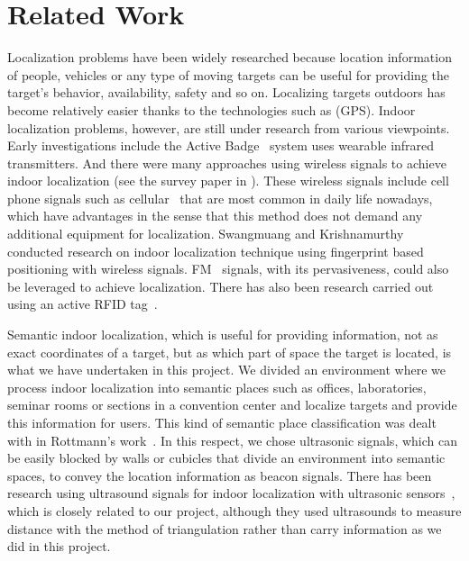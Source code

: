 \section{Related Work}
\label{sec:related-works}

Localization problems have been widely researched because location information of people, vehicles or any type of moving targets can be useful for providing the target's behavior, availability, safety and so on. Localizing targets outdoors has become relatively easier thanks to the technologies such as (GPS). Indoor localization problems, however, are still under research from various viewpoints. Early investigations include the Active Badge~\cite{want1992active} system uses wearable infrared transmitters. And there were many approaches using wireless signals to achieve indoor localization (see the survey paper in \cite{liu2007}). These wireless signals include cell phone signals such as cellular~\cite{otsason2005accurate} that are most common in daily life nowadays, which have advantages in the sense that this method does not demand any additional equipment for localization. Swangmuang and Krishnamurthy~\cite{Swangmuang2008} conducted research on indoor localization technique using fingerprint based positioning with wireless signals. FM~\cite{chen2012fm} signals, with its pervasiveness, could also be leveraged to achieve localization. There has also been research carried out using an active RFID tag~\cite{Jin2006, buettner2009recognizing}.

Semantic indoor localization, which is useful for providing information, not as exact coordinates of a target, but as which part of space the target is located, is what we have undertaken in this project. We divided an environment where we process indoor localization into semantic places such as offices, laboratories, seminar rooms or sections in a convention center and localize targets and provide this information for users. This kind of semantic place classification was dealt with in Rottmann's work~\cite{rottmann2005semantic}. In this respect, we chose ultrasonic signals, which can be easily blocked by walls or cubicles that divide an environment into semantic spaces, to convey the location information as beacon signals. There has been research using ultrasound signals for indoor localization with ultrasonic sensors~\cite{feng1997mobile, priyantha2005cricket}, which is closely related to our project, although they used ultrasounds to measure distance with the method of triangulation rather than carry information as we did in this project.



